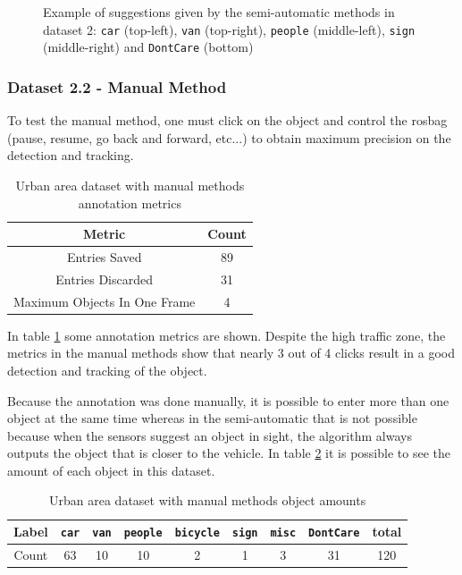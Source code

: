 \begin{figure}[htp]
	\caption{Example of suggestions given by the semi-automatic methods in dataset 2:  \texttt{car} (top-left), \texttt{van} (top-right), \texttt{people} (middle-left), \texttt{sign} (middle-right) and  \texttt{DontCare} (bottom)}
	\label{fig:dataset2results1}
	
\end{figure}


\subsubsection{Dataset 2.2 - Manual Method}

To test the manual method, one must click on the object and control the rosbag (pause, resume, go back and forward, etc...) to obtain maximum precision on the detection and tracking. 

\begin{table}[htp]
	\centering
	\caption{Urban area dataset with manual methods annotation metrics}
	\label{tab: urban2metrics}
	\begin{tabular}{c|c}
		\textbf{Metric}              & \textbf{Count} \\ \hline
		Entries Saved           & 89                      \\ \hline
		Entries Discarded            & 31                      \\ \hline
		Maximum Objects In One Frame & 4                 
	\end{tabular}
\end{table}

In table \ref{tab: urban2metrics} some annotation metrics are shown. Despite the high traffic zone, the metrics in the manual methods show that nearly 3 out of 4 clicks result in a good detection and tracking of the object. 

Because the annotation was done manually, it is possible to enter more than one object at the same time whereas in the semi-automatic that is not possible because when the sensors suggest an object in sight, the algorithm always outputs the object that is closer to the vehicle. In table \ref{tab: urban2stats} it is possible to see the amount of each object in this dataset.

\begin{table}[htp]
	\centering
	\caption{Urban area dataset with manual methods object amounts}
	\label{tab: urban2stats}
	\begin{tabular}{c|c|c|c|c|c|c|c|c}
		\textbf{Label} & \texttt{car} & \texttt{van} & \texttt{people} & \texttt{bicycle} & \texttt{sign} & \texttt{misc} & \texttt{DontCare} & \textbf{total} \\ \hline
		Count          & 63           & 10            & 10               & 2                & 1             & 3             & 31                & 120           
	\end{tabular}
\end{table}

